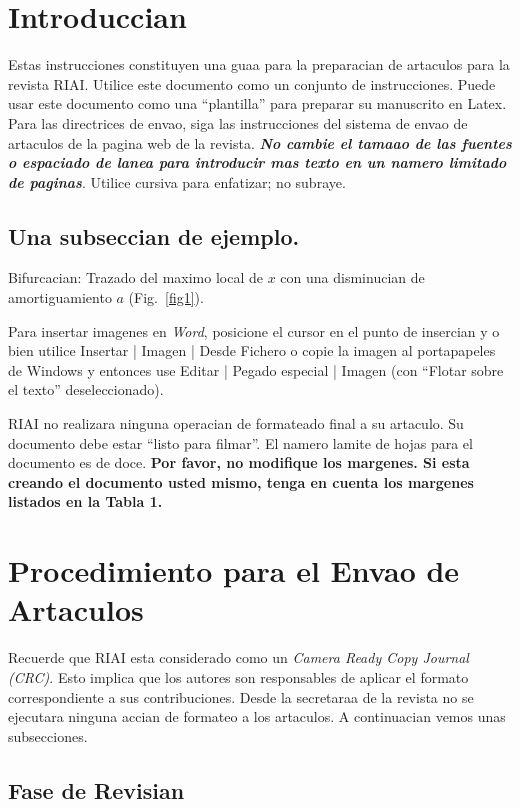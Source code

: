 \documentclass[5p,times,authoryear]{elsarticle}
\begin{document}

\section{Introduccian}
Estas instrucciones constituyen una guaa para la preparacian de
artaculos para la revista RIAI. Utilice este documento como un
conjunto de instrucciones. Puede usar este documento como
una ``plantilla'' para preparar su manuscrito en Latex. Para las directrices
de envao, siga las instrucciones del sistema de envao de artaculos
de la pagina web de la revista.
 {\bf{\emph {No cambie el tamaao de las fuentes o espaciado de lanea para introducir mas texto en un namero limitado de paginas}}}.  Utilice cursiva para enfatizar; no subraye.

\subsection{Una subseccian de ejemplo.}
Bifurcacian: Trazado del maximo local de $x$ con una disminucian de amortiguamiento $a$ (Fig.~\ref{fig1}).

Para insertar imagenes en \emph{Word}, posicione el cursor en el punto de insercian y o bien utilice Insertar | Imagen | Desde Fichero o copie la imagen al portapapeles de Windows y entonces use Editar | Pegado especial | Imagen (con ``Flotar sobre el texto'' deseleccionado).

RIAI no realizara ninguna operacian de formateado final a su artaculo. Su documento debe estar ``listo para filmar''. El namero lamite de hojas para el documento es de doce. {\bf Por favor, no modifique los margenes. Si esta creando el documento usted mismo, tenga en cuenta los margenes listados en la Tabla 1.}

\section{Procedimiento para el Envao de Artaculos}

Recuerde que RIAI esta considerado como un \emph{Camera Ready Copy Journal (CRC)}. Esto implica que los autores son responsables de aplicar el formato correspondiente a sus contribuciones. Desde la secretaraa de la revista no se ejecutara ninguna accian de formateo a los artaculos. A continuacian vemos unas subsecciones.

\subsection{Fase de Revisian}
\end{document}
